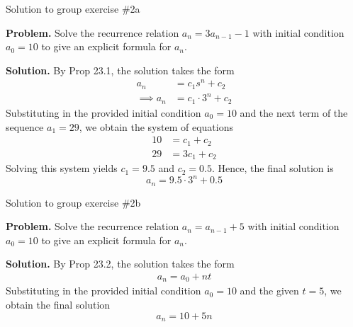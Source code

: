\documentclass[10pt]{beamer}
\begin{document}
\begin{frame}{Solution to group exercise \#2a}

\colorbox{red!30}{\textbf{Problem.}} Solve the recurrence relation $a_n = 3 a_{n-1} -1$ with initial condition $a_0=10$ to give an explicit formula for $a_n$. 

\vfill 
	
\colorbox{green!30}{\textbf{Solution.}} By Prop 23.1, the solution takes the form 
%
\begin{align*}
a_n &= c_1 s^n + c_2 \\
\implies a_n &= c_1 \cdot 3^n + c_2
\end{align*}
%
Substituting in the provided initial condition $a_0=10$ and the next term of the sequence $a_1 =29$, we obtain the system of equations
%
\begin{align*}
10 &= c_1 + c_2 \\
29 &= 3c_1 + c_2
\end{align*}
%
Solving this system yields $c_1 = 9.5$ and $c_2 = 0.5$.  Hence, the final solution is
\[ a_n = 9.5 \cdot 3^n + 0.5 \]


\end{frame}


\begin{frame}{Solution to group exercise \#2b}

\colorbox{red!30}{\textbf{Problem.}} Solve the recurrence relation  $a_n = a_{n-1} + 5$  with initial condition $a_0=10$ to give an explicit formula for $a_n$. 

\vfill 
	
\colorbox{green!30}{\textbf{Solution.}} By Prop 23.2, the solution takes the form 
%
\begin{align*}
a_n = a_0 + nt
\end{align*}
%
Substituting in the provided initial condition $a_0=10$ and the given $t=5$, we obtain the final solution 
\[ a_n = 10 + 5n \]

\end{frame}
\end{document}
